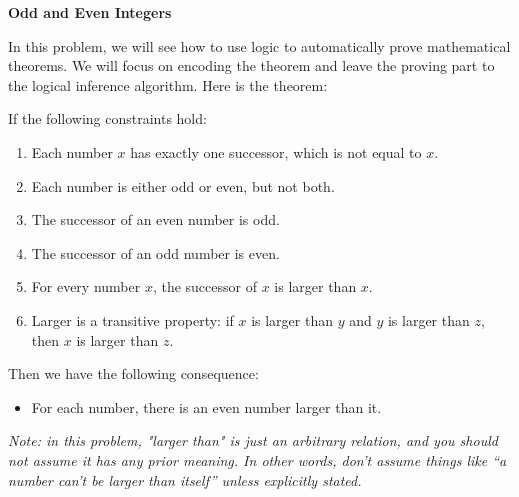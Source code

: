 \item {\bf Odd and Even Integers}

In this problem, we will see how to use logic to automatically prove
mathematical theorems.  We will focus on encoding the theorem and leave the
proving part to the logical inference algorithm. Here is the theorem:

If the following constraints hold:
\begin{enumerate}[label=\arabic*., itemsep=0em]
   \item Each number $x$ has exactly one successor, which is not equal to $x$.
   \item Each number is either odd or even, but not both.
   \item The successor of an even number is odd.
   \item The successor of an odd number is even.
   \item For every number $x$, the successor of $x$ is larger than $x$.
   \item Larger is a transitive property: if $x$ is larger than $y$ and $y$ is
        larger than $z$, then $x$ is larger than $z$.
\end{enumerate}
Then we have the following consequence:
\begin{itemize}
  \item For each number, there is an even number larger than it.
\end{itemize}

{\em Note: in this problem, "larger than" is just an arbitrary relation, and you
should not assume it has any prior meaning.  In other words, don't assume things
like ``a number can't be larger than itself'' unless explicitly stated.}

\begin{enumerate}

  

  

\end{enumerate}
